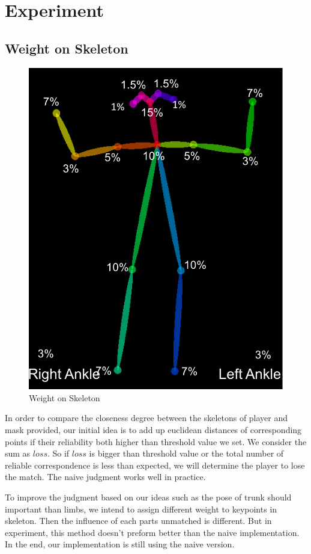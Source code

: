 \documentclass[11pt,twocolumn,letterpaper]{article}
\begin{document}
\section{Experiment}
	\subsection{Weight on Skeleton}
      \begin{figure}[h]
      \centering
      \includegraphics[width=0.8\linewidth]{./Pic/skeleton}
      \caption{Weight on Skeleton}
      \end{figure}

      \par In order to compare the closeness degree between the skeletons of player and mask provided, our initial idea is to add up euclidean distances of corresponding points if their reliability both higher than threshold value we set. We consider the sum as $loss$. So if $loss$ is bigger than threshold value or the total number of reliable correspondence is less than expected, we will determine the player to lose the match. The naive judgment works well in practice.
      \par To improve the judgment based on our ideas such as the pose of trunk should important than limbs, we intend to assign different weight to keypoints in skeleton. Then the influence of each parts unmatched is different. But in experiment, this method doesn't preform better than the naive implementation. In the end, our implementation is still using the naive version.
\end{document}
